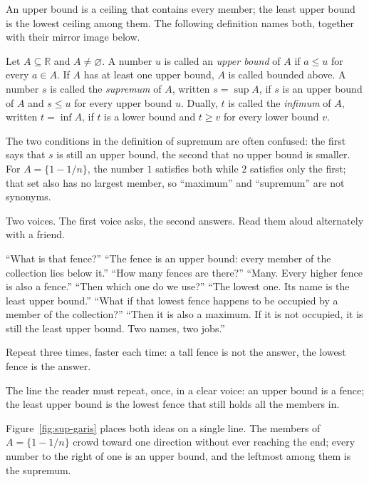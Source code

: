 An upper bound is a ceiling that contains every member; the least upper bound is the
lowest ceiling among them. The following definition names both, together with their
mirror image below.

\begin{definisi}
Let $A\subseteq\mathbb{R}$ and $A\neq\varnothing$. A number $u$ is called an
\emph{upper bound} of $A$ if $a\le u$ for every $a\in A$. If $A$ has at least one upper
bound, $A$ is called bounded above. A number $s$ is called the \emph{supremum} of $A$,
written $s=\sup A$, if $s$ is an upper bound of $A$ and $s\le u$ for every upper bound
$u$. Dually, $t$ is called the \emph{infimum} of $A$, written $t=\inf A$, if $t$ is a
lower bound and $t\ge v$ for every lower bound $v$.
\end{definisi}

The two conditions in the definition of supremum are often confused: the first says
that $s$ is still an upper bound, the second that no upper bound is smaller. For
$A=\{1-1/n\}$, the number $1$ satisfies both while $2$ satisfies only the first; that
set also has no largest member, so ``maximum'' and ``supremum'' are not synonyms.

\begin{bacakeras}
Two voices. The first voice asks, the second answers. Read them aloud alternately with
a friend.

``What is that fence?'' ``The fence is an upper bound: every member of the collection
lies below it.'' ``How many fences are there?'' ``Many. Every higher fence is also a
fence.'' ``Then which one do we use?'' ``The lowest one. Its name is the least upper
bound.'' ``What if that lowest fence happens to be occupied by a member of the
collection?'' ``Then it is also a maximum. If it is not occupied, it is still the least
upper bound. Two names, two jobs.''

Repeat three times, faster each time: a tall fence is not the answer, the lowest fence
is the answer.

The line the reader must repeat, once, in a clear voice: an upper bound is a fence; the
least upper bound is the lowest fence that still holds all the members in.
\end{bacakeras}

Figure~\ref{fig:sup-garis} places both ideas on a single line. The members of
$A=\{1-1/n\}$ crowd toward one direction without ever reaching the end; every number to
the right of one is an upper bound, and the leftmost among them is the supremum.

